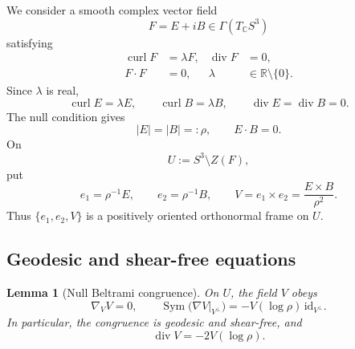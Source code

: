 \documentclass[aps,prd,reprint,nofootinbib,superscriptaddress]{revtex4-2}
\newtheorem{lemma}[theorem]{Lemma}
\theoremstyle{definition}
\theoremstyle{remark}
\newcommand{\R}{\mathbb{R}}
\newcommand{\C}{\mathbb{C}}
\newcommand{\Div}{\operatorname{div}}
\newcommand{\Curl}{\operatorname{curl}}
\newcommand{\id}{\mathrm{id}}
\begin{document}
We consider a smooth complex vector field
\[
F=E+iB\in\Gamma(T_\C S^3)
\]
satisfying
\begin{align}
\Curl F&=\lambda F, & \Div F&=0,\nonumber\\
F\cdot F&=0, & \lambda&\in\R\setminus\{0\}.
\label{eq:nullbeltrami}
\end{align}
Since $\lambda$ is real,
\begin{equation}
\Curl E=\lambda E,
\qquad
\Curl B=\lambda B,
\qquad
\Div E=\Div B=0.
\label{eq:realbeltrami}
\end{equation}
The null condition gives
\begin{equation}
|E|=|B|=:\rho,
\qquad E\cdot B=0.
\label{eq:nullrelations}
\end{equation}
On
\[
U:=S^3\setminus Z(F),
\]
put
\begin{equation}
e_1=\rho^{-1}E,
\qquad e_2=\rho^{-1}B,
\qquad V=e_1\times e_2=\frac{E\times B}{\rho^2}.
\label{eq:poynting}
\end{equation}
Thus $\{e_1,e_2,V\}$ is a positively oriented orthonormal frame on $U$.

\subsection{Geodesic and shear-free equations}

\begin{lemma}[Null Beltrami congruence]
\label{lem:congruence}
On $U$, the field $V$ obeys
\begin{equation}
\nabla_VV=0,
\qquad
\operatorname{Sym}\bigl(\nabla V|_{V^\perp}\bigr)
=-V(\log\rho)\,\id_{V^\perp}.
\label{eq:congruence}
\end{equation}
In particular, the congruence is geodesic and shear-free, and
\begin{equation}
\Div V=-2V(\log\rho).
\label{eq:divV}
\end{equation}
\end{lemma}
\end{document}

